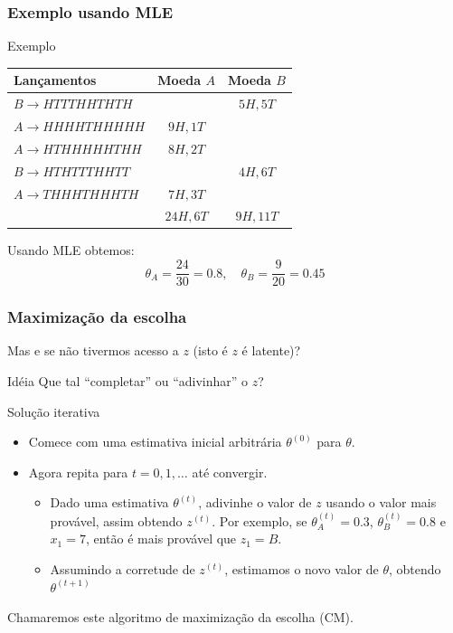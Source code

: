 \documentclass{beamer}
\begin{document}
\begin{frame}

	\frametitle{Exemplo usando MLE}
	\begin{exampleblock}{Exemplo}
		\begin{center}
			\begin{tabular}{l | c | c }
			Lançamentos & Moeda $A$ & Moeda $B$ \\
			\hline
			$B\to HTTTHHTHTH$	 & & $5H, 5T$ \\
			$A\to HHHHTHHHHH$ & $9H, 1T$ & \\
			$A\to HTHHHHHTHH$ & $8H, 2T$ & \\
			$B\to HTHTTTHHTT$ & & $4H, 6T$ \\
			$A\to THHHTHHHTH$ & $7H, 3T$ & \\
			\hline
			& $24H, 6T$ & $9H, 11T$\\
			\end{tabular}
		\end{center}
	\end{exampleblock}
	\pause
	Usando MLE obtemos:
	\[
		\theta_A = \frac{24}{30} = 0.8,
		\quad \theta_B = \frac{9}{20} = 0.45
	\]

\end{frame}

\begin{frame}

	\frametitle{Maximização da escolha}
	Mas e se não tivermos acesso a $z$ (isto é $z$ é latente)?
	\pause
	\begin{alertblock}{Idéia}
		Que tal ``completar'' ou ``adivinhar'' o $z$?
	\end{alertblock}
	\pause
	\begin{block}{Solução iterativa}
		\begin{itemize}
		\item Comece com uma estimativa inicial arbitrária $\theta^{(0)}$
		para $\theta$. \pause
		\item Agora repita para $t=0,1,\ldots$ até convergir. \pause
			\begin{itemize}
				\item Dado uma estimativa $\theta^{(t)}$, adivinhe o valor
				de $z$ usando o valor mais provável, assim obtendo
				$z^{(t)}$. \pause
				Por exemplo, se $\theta^{(t)}_A = 0.3$, $\theta^{(t)}_B=0.8$
				e $x_1 = 7$, então é mais provável que $z_1 = B$. \pause
				\item Assumindo a corretude de $z^{(t)}$, estimamos o
				novo valor de $\theta$, obtendo $\theta^{(t+1)}$
			\end{itemize}
		\end{itemize}
	\end{block}
	\pause
	Chamaremos este algoritmo de maximização da escolha (CM).

\end{frame}
\end{document}
